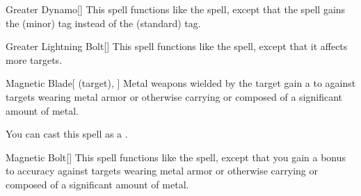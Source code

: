 \lowercase{\hypertarget{spell:Greater Dynamo}{}}\label{spell:Greater Dynamo}
\begin{freeability}[\nth{3}]{\hypertarget{spell:Greater Dynamo}{Greater Dynamo}}[]
This spell functions like the  spell, except that the spell gains the  (minor) tag instead of the  (standard) tag.
\end{freeability}
\vspace{0.25em}



\lowercase{\hypertarget{spell:Greater Lightning Bolt}{}}\label{spell:Greater Lightning Bolt}
\begin{freeability}[\nth{3}]{\hypertarget{spell:Greater Lightning Bolt}{Greater Lightning Bolt}}[]
This spell functions like the  spell, except that it affects more targets.
\end{freeability}
\vspace{0.25em}



\lowercase{\hypertarget{spell:Magnetic Blade}{}}\label{spell:Magnetic Blade}
\begin{attuneability}[\nth{3}]{\hypertarget{spell:Magnetic Blade}{Magnetic Blade}}[ (target), ]
Metal weapons wielded by the target gain a   to  against targets wearing metal armor or otherwise carrying or composed of a significant amount of metal.

You can cast this spell as a .
\end{attuneability}
\vspace{0.25em}



\lowercase{\hypertarget{spell:Magnetic Bolt}{}}\label{spell:Magnetic Bolt}
\begin{freeability}[\nth{3}]{\hypertarget{spell:Magnetic Bolt}{Magnetic Bolt}}[]
This spell functions like the  spell, except that you gain a  bonus to accuracy against targets wearing metal armor or otherwise carrying or composed of a significant amount of metal.
\end{freeability}
\vspace{0.25em}



